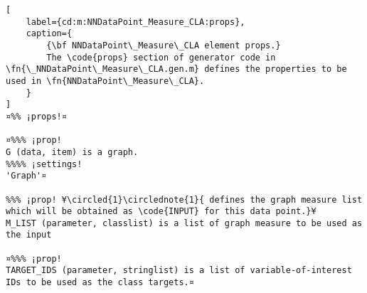 \documentclass{tufte-handout}
\begin{document}
\begin{lstlisting}[
	label={cd:m:NNDataPoint_Measure_CLA:props},
	caption={
		{\bf NNDataPoint\_Measure\_CLA element props.}
		The \code{props} section of generator code in \fn{\_NNDataPoint\_Measure\_CLA.gen.m} defines the properties to be used in \fn{NNDataPoint\_Measure\_CLA}.
	}
]
¤%% ¡props!¤

¤%%% ¡prop!  
G (data, item) is a graph.
%%%% ¡settings!
'Graph'¤

%%% ¡prop! ¥\circled{1}\circlednote{1}{ defines the graph measure list which will be obtained as \code{INPUT} for this data point.}¥
M_LIST (parameter, classlist) is a list of graph measure to be used as the input

¤%%% ¡prop!
TARGET_IDS (parameter, stringlist) is a list of variable-of-interest IDs to be used as the class targets.¤

\end{lstlisting}

\clearpage
\end{document}
